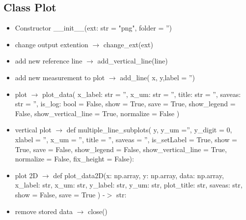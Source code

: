 \documentclass{article}
\begin{document}
\begin{multicols}{2}
\subsection{Class Plot}
\begin{itemize}
\item Constructor \_\_init\_\_(ext: str = "png", folder = '')
\item change output extention $\rightarrow$ change\_ext(ext)
\item add new reference line $\rightarrow$ add\_vertical\_line(line)
\item add new measurement to plot $\rightarrow$ add\_line( x, y,label = '')
\item plot $\rightarrow$ plot\_data(
             x\_label: str = '',
             x\_um: str = '',
             title: str = '',
             saveas: str = '',
             is\_log: bool = False,
             show = True,
             save = True,
             show\_legend = False,
             show\_vertical\_line = True,
             normalize = False
             )
\item vertical plot $\rightarrow$     def multiple\_line\_subplots( y, y\_um ='', y\_digit = 0,
                                    xlabel = '', x\_um = '',
                                    title = '', saveas = '',
                                    is\_setLabel = True, show = True, 
                                    save = False, show\_legend = False,
                                     show\_vertical\_line = True,
                                     normalize = False, fix\_height = False):          
\item plot 2D $\rightarrow$     def plot\_data2D(x: np.array,
             y: np.array,
             data: np.array,
             x\_label: str,
             x\_um: str,
             y\_label: str,
             y\_um: str,
             plot\_title: str,
             saveas: str,
             show = False,
             save = True ) -$>$ str:
\item remove stored data $\rightarrow$ close()             	
\end{itemize}
\end{multicols}

\printbibliography
\end{document}
